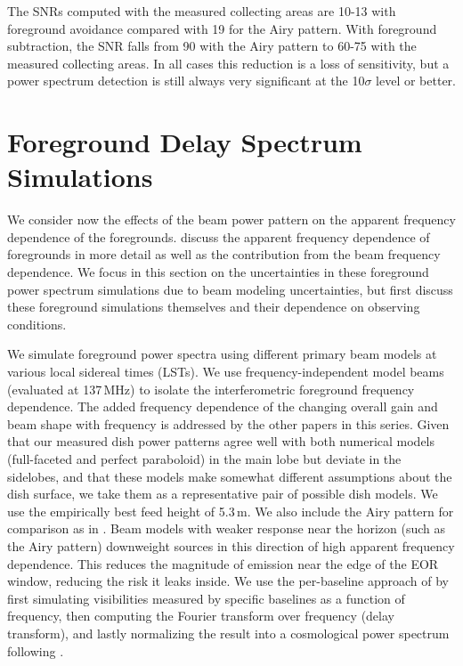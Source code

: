 \documentclass{emulateapj}
\begin{document}
The SNRs computed with the measured collecting areas are 10-13 with foreground avoidance compared with 19 for the Airy pattern. With foreground subtraction, the SNR falls from 90 with the Airy pattern to 60-75 with the measured collecting areas. In all cases this reduction is a loss of sensitivity, but a power spectrum detection is still always very significant at the 10$\sigma$ level or better.

\section{Foreground Delay Spectrum Simulations}
\label{sec:foregrounds}

We consider now the effects of the beam power pattern on the apparent frequency dependence of the foregrounds. \citet{nithya16} discuss the apparent frequency dependence of foregrounds in more detail as well as the contribution from the beam frequency dependence. We focus in this section on the uncertainties in these foreground power spectrum simulations due to beam modeling uncertainties, but first discuss these foreground simulations themselves and their dependence on observing conditions. 

We simulate foreground power spectra using different primary beam models at various local sidereal times (LSTs). We use frequency-independent model beams (evaluated at 137\,MHz) to isolate the interferometric foreground frequency dependence. The added frequency dependence of the changing overall gain and beam shape with frequency is addressed by the other papers in this series. Given that our measured dish power patterns agree well with both numerical models (full-faceted and perfect paraboloid) in the main lobe but deviate in the sidelobes, and that these models make somewhat different assumptions about the dish surface, we take them as a representative pair of possible dish models. We use the empirically best feed height of 5.3\,m. We also include the Airy pattern for comparison as in \citet{nithya15}. Beam models with weaker response near the horizon (such as the Airy pattern) downweight sources in this direction of high apparent frequency dependence. This reduces the magnitude of emission near the edge of the EOR window, reducing the risk it leaks inside. We use the per-baseline approach of \citet{parsons12a,parsons12b} by first simulating visibilities measured by specific baselines as a function of frequency, then computing the Fourier transform over frequency (delay transform), and lastly normalizing the result into a cosmological power spectrum following \citet{nithya15}. 
\end{document}
